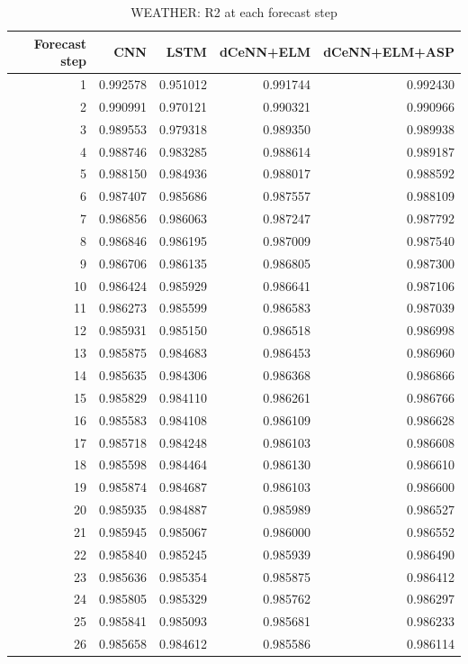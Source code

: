 \begin{table}
\caption{WEATHER: R2 at each forecast step}
\begin{tabular}{rrrrr}
\toprule
Forecast step & CNN & LSTM & dCeNN+ELM & dCeNN+ELM+ASP \\
\midrule
1 & 0.992578 & 0.951012 & 0.991744 & 0.992430 \\
2 & 0.990991 & 0.970121 & 0.990321 & 0.990966 \\
3 & 0.989553 & 0.979318 & 0.989350 & 0.989938 \\
4 & 0.988746 & 0.983285 & 0.988614 & 0.989187 \\
5 & 0.988150 & 0.984936 & 0.988017 & 0.988592 \\
6 & 0.987407 & 0.985686 & 0.987557 & 0.988109 \\
7 & 0.986856 & 0.986063 & 0.987247 & 0.987792 \\
8 & 0.986846 & 0.986195 & 0.987009 & 0.987540 \\
9 & 0.986706 & 0.986135 & 0.986805 & 0.987300 \\
10 & 0.986424 & 0.985929 & 0.986641 & 0.987106 \\
11 & 0.986273 & 0.985599 & 0.986583 & 0.987039 \\
12 & 0.985931 & 0.985150 & 0.986518 & 0.986998 \\
13 & 0.985875 & 0.984683 & 0.986453 & 0.986960 \\
14 & 0.985635 & 0.984306 & 0.986368 & 0.986866 \\
15 & 0.985829 & 0.984110 & 0.986261 & 0.986766 \\
16 & 0.985583 & 0.984108 & 0.986109 & 0.986628 \\
17 & 0.985718 & 0.984248 & 0.986103 & 0.986608 \\
18 & 0.985598 & 0.984464 & 0.986130 & 0.986610 \\
19 & 0.985874 & 0.984687 & 0.986103 & 0.986600 \\
20 & 0.985935 & 0.984887 & 0.985989 & 0.986527 \\
21 & 0.985945 & 0.985067 & 0.986000 & 0.986552 \\
22 & 0.985840 & 0.985245 & 0.985939 & 0.986490 \\
23 & 0.985636 & 0.985354 & 0.985875 & 0.986412 \\
24 & 0.985805 & 0.985329 & 0.985762 & 0.986297 \\
25 & 0.985841 & 0.985093 & 0.985681 & 0.986233 \\
26 & 0.985658 & 0.984612 & 0.985586 & 0.986114 \\

\end{tabular}
\end{table}
